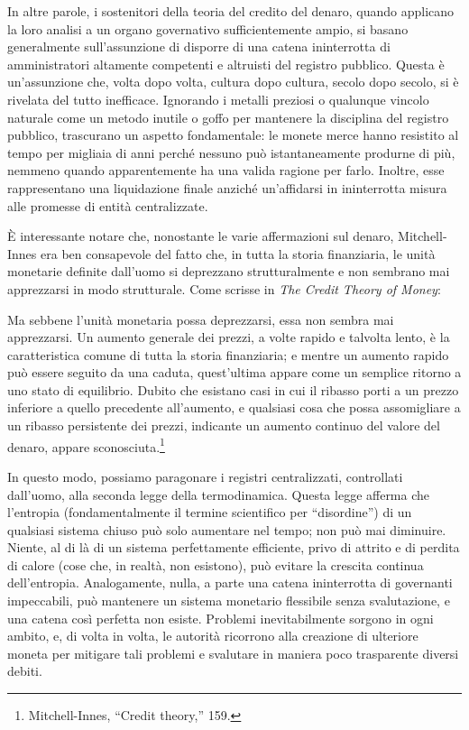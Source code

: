 \documentclass[
  a5paper,
  smalldemyvopaper,10pt,twoside,onecolumn,openright,extrafontsizes,hidelinks]{memoir}
\renewenvironment{quote}%
               {\list{}{\rightmargin=.6cm\leftmargin=.6cm}%
                \itshape \item[]}%
               {\endlist}
\begin{document}
In altre parole, i sostenitori della teoria del credito del denaro,
quando applicano la loro analisi a un organo governativo
sufficientemente ampio, si basano generalmente sull'assunzione di
disporre di una catena ininterrotta di amministratori altamente
competenti e altruisti del registro pubblico. Questa è un'assunzione
che, volta dopo volta, cultura dopo cultura, secolo dopo secolo, si è
rivelata del tutto inefficace. Ignorando i metalli preziosi o qualunque
vincolo naturale come un metodo inutile o goffo per mantenere la
disciplina del registro pubblico, trascurano un aspetto fondamentale: le
monete merce hanno resistito al tempo per migliaia di anni perché
nessuno può istantaneamente produrne di più, nemmeno quando
apparentemente ha una valida ragione per farlo. Inoltre, esse
rappresentano una liquidazione finale anziché un'affidarsi in
ininterrotta misura alle promesse di entità centralizzate.

È interessante notare che, nonostante le varie affermazioni sul denaro,
Mitchell-Innes era ben consapevole del fatto che, in tutta la storia
finanziaria, le unità monetarie definite dall'uomo si deprezzano
strutturalmente e non sembrano mai apprezzarsi in modo strutturale. Come
scrisse in \emph{The Credit Theory of Money}:

\begin{quote}
Ma sebbene l'unità monetaria possa deprezzarsi, essa non sembra mai
apprezzarsi. Un aumento generale dei prezzi, a volte rapido e talvolta
lento, è la caratteristica comune di tutta la storia finanziaria; e
mentre un aumento rapido può essere seguito da una caduta, quest'ultima
appare come un semplice ritorno a uno stato di equilibrio. Dubito che
esistano casi in cui il ribasso porti a un prezzo inferiore a quello
precedente all'aumento, e qualsiasi cosa che possa assomigliare a un
ribasso persistente dei prezzi, indicante un aumento continuo del valore
del denaro, appare sconosciuta.\footnote{Mitchell-Innes, ``Credit
  theory,'' 159.}
\end{quote}

In questo modo, possiamo paragonare i registri centralizzati,
controllati dall'uomo, alla seconda legge della termodinamica. Questa
legge afferma che l'entropia (fondamentalmente il termine scientifico
per ``disordine'') di un qualsiasi sistema chiuso può solo aumentare nel
tempo; non può mai diminuire. Niente, al di là di un sistema
perfettamente efficiente, privo di attrito e di perdita di calore (cose
che, in realtà, non esistono), può evitare la crescita continua
dell'entropia. Analogamente, nulla, a parte una catena ininterrotta di
governanti impeccabili, può mantenere un sistema monetario flessibile
senza svalutazione, e una catena così perfetta non esiste. Problemi
inevitabilmente sorgono in ogni ambito, e, di volta in volta, le
autorità ricorrono alla creazione di ulteriore moneta per mitigare tali
problemi e svalutare in maniera poco trasparente diversi debiti.
\end{document}
